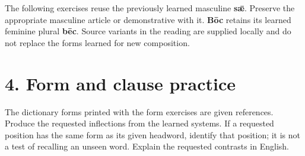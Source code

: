 The following exercises reuse the previously learned masculine \textbf{sǣ}. Preserve the appropriate masculine article or demonstrative with it. \textbf{Bōc} retains its learned feminine plural \textbf{bēc}. Source variants in the reading are supplied locally and do not replace the forms learned for new composition.

\section*{4. Form and clause practice}

The dictionary forms printed with the form exercises are given references. Produce the requested inflections from the learned systems. If a requested position has the same form as its given headword, identify that position; it is not a test of recalling an unseen word. Explain the requested contrasts in English.


